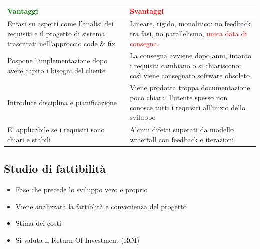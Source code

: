 \documentclass[12pt, a4paper]{report}
\begin{document}
\begin{center}

\begin{tabular}{|p{}|p{}|}
    \hline
    \textbf{\textcolor{green}{Vantaggi}} & \textbf{\textcolor{red}{Svantaggi}} \\
    \hline
    Enfasi su aspetti come l'analisi dei requisiti e il progetto di sistema trascurati nell'approccio code \& fix & Lineare, rigido, monolitico: no feedback tra fasi, no parallelismo, \textcolor{red}{unica data di consegna} \\
    \hline
    Pospone l'implementazione dopo avere capito i bisogni del cliente & La consegna avviene dopo anni, intanto i requisiti cambiano o si chiariscono: così viene consegnato software obsoleto \\
    \hline
    Introduce disciplina e pianificazione & Viene prodotta troppa documentazione poco chiara: l'utente spesso non conosce tutti i requisiti all'inizio dello sviluppo \\
    \hline
    E' applicabile se i requisiti sono chiari e stabili & Alcuni difetti superati da modello waterfall con feedback e iterazioni \\
    \hline
\end{tabular}
\end{center}
\subsection{Studio di fattibilità}
\begin{itemize}
    \item Fase che precede lo sviluppo vero e proprio
    \item Viene analizzata la fattiblità e convenienza del progetto
    \item Stima dei costi
    \item Si valuta il Return Of Investment (ROI)
\end{itemize}
\end{document}
